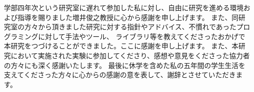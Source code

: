 \begin{acknowledgment}
    学部四年次という研究室に遅れて参加した私に対し、自由に研究を進める環境および指導を賜りました増井俊之教授に心から感謝を申し上げます。
    また、同研究室の方々から頂きました研究に対する指針やアドバイス、不慣れであったプログラミングに対して手法やツール、
    ライブラリ等を教えてくださったおかげで本研究をつづけることができました。ここに感謝を申し上げます。
    また、本研究において実施された実験に参加してくださり、感想や意見をくださった協力者の方々にも深く感謝いたします。
    最後に休学を含めた私の五年間の学生生活を支えてくださった方々に心からの感謝の意を表して、謝辞とさせていただきます。
\end{acknowledgment}
